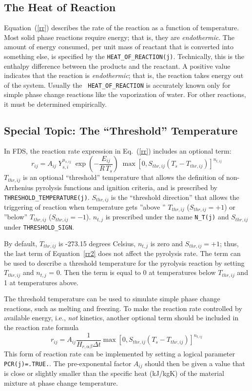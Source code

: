 \documentclass[11pt]{book}
\newcommand{\ct}{\tt\small}
\newcommand{\be}{\begin{equation}}
\newcommand{\ee}{\end{equation}}
\begin{document}
\subsection{The Heat of Reaction}

Equation~(\ref{rr}) describes the rate of the reaction as a function
of temperature.  Most solid phase reactions require energy; that is,
they are {\em endothermic}. The amount of energy consumed, per unit
mass of reactant that is converted into something else, is specified
by the {\ct HEAT\_OF\_REACTION(j)}. Technically, this is the enthalpy
difference between the products and the reactant. A positive value
indicates that the reaction is {\em endothermic}; that is, the
reaction takes energy out of the system. Usually the {\ct
HEAT\_OF\_REACTION} is accurately known only for simple phase change
reactions like the vaporization of water. For other reactions, it must
be determined empirically.


\subsection{Special Topic: The ``Threshold'' Temperature}

In FDS, the reaction rate expression in Eq.~(\ref{rr}) includes an optional term:
\be
  r_{ij} = A_{ij} \; Y_{s,i}^{n_{s,ij}} \; \exp \left(-\frac{E_{ij}}{R \, T_s} \right) \;
  \max\left[0,S_{thr,ij}(T_s-T_{thr,ij})\right]^{n_{t,ij}}
  \label{rr2}
\ee
$T_{thr,ij}$ is an optional ``threshold'' temperature that
allows the definition of non-Arrhenius pyrolysis functions and
ignition criteria, and is prescribed by {\ct THRESHOLD\_TEMPERATURE(j)}.
$S_{thr,ij}$ is the ``threshold direction'' that allows the triggering of reaction
when temperature gets ''above '' $T_{thr,ij}$ ($S_{thr,ij}=+1$) or ''below'' $T_{thr,ij}$ ($S_{thr,ij}=-1$).
$n_{t,j}$ is prescribed under the name {\ct N\_T(j)} and $S_{thr,ij}$ under {\ct THRESHOLD\_SIGN}.

By default, $T_{thr,ij}$ is -273.15 degrees Celsius, $n_{t,j}$ is zero and $S_{thr,ij}=+1$;
thus, the last term of Equation~\ref{rr2} does not affect the pyrolysis rate.
The term can be used to describe a threshold temperature for the pyrolysis
reaction by setting $T_{thr,ij}$ and $n_{t,j}$ = 0. Then the term
is equal to 0 at temperatures below $T_{thr,ij}$ and 1 at temperatures above.

The threshold temperature can be used to simulate simple phase change reactions, such as melting and freezing.
To make the reaction rate controlled by available energy, i.e., {\em not} kinetics, another optional term should be included
in the reaction rate formula
\be
  r_{ij} = A_{ij}\frac{1}{H_{r,\alpha\beta}\Delta t} \max\left[0,S_{thr,ij}(T_s-T_{thr,ij})\right]^{n_{t,ij}}
  \label{rr3}
\ee
This form of reaction rate can be implemented by setting a logical parameter {\ct PCR(j)=.TRUE.}. The pre-exponental
factor $A_{ij}$ should then be given a value that is close or slightly smaller than the specific heat (kJ/kgK) of the material mixture at
phase change temperature.
\end{document}

